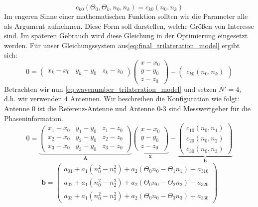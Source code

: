 {\begin{shaded}
\begin{equation}
c_{k0}(\Theta_0, \Theta_k, n_0, n_k) = c_{k0}(n_0, n_k)
\end{equation}
%
Im engeren Sinne einer mathematischen Funktion sollten wir die Parameter alle als Argument aufnehmen. Diese Form soll darstellen, welche Größen von Interesse sind. Im späteren Gebrauch wird diese Gleichung in der Optimierung eingesetzt werden.
Für unser Gleichungssystem aus\eqref{eq:final_trilateration_model} ergibt sich:
\begin{equation}\label{eq:wavenumber_trilateration_model}
0=
\left(
	\begin{array}{ccc}
		x_k-x_0 & y_k-y_0 & z_k-z_0 
	\end{array}
\right)
\left(
   \begin{array}{c}
	   x-x_0\\
	   y-y_0\\
	   z-z_0
   \end{array}
\right)
-
\left(
	\begin{array}{c}
		c_{k0}(n_0, n_k)
	\end{array}
\right)
\end{equation}
%
Betrachten wir nun \eqref{eq:wavenumber_trilateration_model} und setzen $N'=4$, d.h. wir verwenden 4 Antennen. Wir beschreiben die Konfiguration wie folgt: Antenne 0 ist die Referenz-Antenne und Antenne 0-3 sind Messwertgeber für die Phaseninformation. 
%
\begin{equation}\label{eq:wavenumber_trilateration_model_explicit}
0=
\underbrace{\left(
	\begin{array}{ccc}
		x_1-x_0 & y_1-y_0 & z_1-z_0 \\
		x_2-x_0 & y_2-y_0 & z_2-z_0 \\
		x_3-x_0 & y_3-y_0 & z_3-z_0 
	\end{array}
\right)}_{\textbf{A}}
\underbrace{\left(
   \begin{array}{c}
	   x-x_0\\
	   y-y_0\\
	   z-z_0
   \end{array}
\right)}_{\textbf{x}}
-
\underbrace{\left(
	\begin{array}{c}
		c_{10}(n_0, n_1) \\
		c_{20}(n_0, n_2) \\
		c_{30}(n_0, n_3)
	\end{array}
\right)}_{\textbf{b}}
\end{equation}
%
\begin{equation}
\mathbf{b}=
\left(
	\begin{array}{c}
		a_{01}+a_1( n_0^2-n_1^2)+a_2(\Theta_0n_0-\Theta_1n_1)-a_{310} \\
		a_{02}+a_1(n_0^2-n_2^2)+a_2(\Theta_0n_0-\Theta_2n_2)-a_{320} \\
		a_{03}+a_1(n_0^2-n_3^2)+a_2(\Theta_0n_0-\Theta_3n_3)-a_{330}
	\end{array}
\right)
\end{equation}


\end{shaded}}
